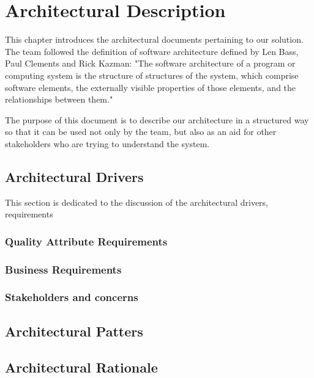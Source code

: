 \chapter{Architectural Description}
This chapter introduces the architectural documents pertaining to our solution. The team followed the definition of software architecture defined by Len Bass, Paul Clements and Rick Kazman: "The software architecture of a program or computing
system is the structure of structures of the system, which comprise software elements, the externally visible properties of those elements, and the relationships between them."

The purpose of this document is to describe our architecture in a structured way so that it can be used not only by the team, but also as an aid for other stakeholders who are trying to understand the system.

\section{Architectural Drivers}
This section is dedicated to the discussion of the architectural drivers, requirements 

\subsection{Quality Attribute Requirements}

\subsection{Business Requirements}

\subsection{Stakeholders and concerns}

\section{Architectural Patters}

\section{Architectural Rationale}

